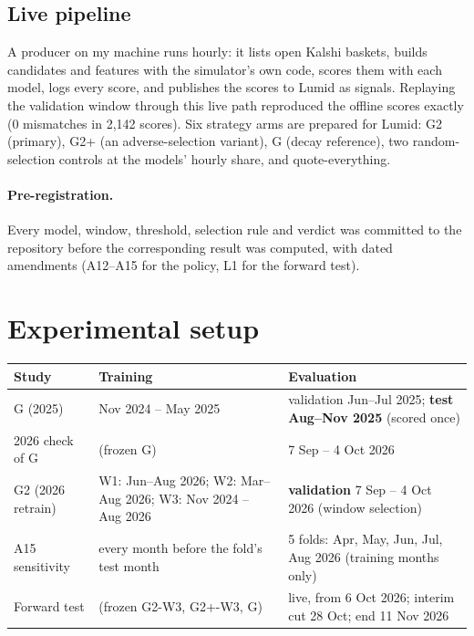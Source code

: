 \documentclass[11pt,a4paper]{article}
\begin{document}
\subsection{Live pipeline}
A producer on my machine runs hourly: it lists open Kalshi baskets, builds candidates and features with the
simulator's own code, scores them with each model, logs every score, and publishes the scores to Lumid as
signals. Replaying the validation window through this live path reproduced the offline scores exactly (0
mismatches in 2,142 scores). Six strategy arms are prepared for Lumid: G2 (primary), G2+ (an adverse-selection
variant), G (decay reference), two random-selection controls at the models' hourly share, and quote-everything.

\paragraph{Pre-registration.} Every model, window, threshold, selection rule and verdict was committed to the
repository before the corresponding result was computed, with dated amendments (A12--A15 for the policy, L1 for
the forward test).

\section{Experimental setup}\label{sec:setup}

\begin{center}
\small
\begin{tabularx}{\textwidth}{l L L}
\toprule
Study & Training & Evaluation \\
\midrule
G (2025) & Nov 2024 -- May 2025 & validation Jun--Jul 2025; \textbf{test Aug--Nov 2025} (scored once) \\
2026 check of G & (frozen G) & 7 Sep -- 4 Oct 2026 \\
G2 (2026 retrain) & W1: Jun--Aug 2026; W2: Mar--Aug 2026; W3: Nov 2024 -- Aug 2026 & \textbf{validation} 7 Sep -- 4 Oct 2026
  (window selection) \\
A15 sensitivity & every month before the fold's test month & 5 folds: Apr, May, Jun, Jul, Aug 2026 (training months only) \\
Forward test & (frozen G2-W3, G2+-W3, G) & live, from 6 Oct 2026; interim cut 28 Oct; end 11 Nov 2026 \\
\bottomrule
\end{tabularx}
\end{center}
\end{document}
